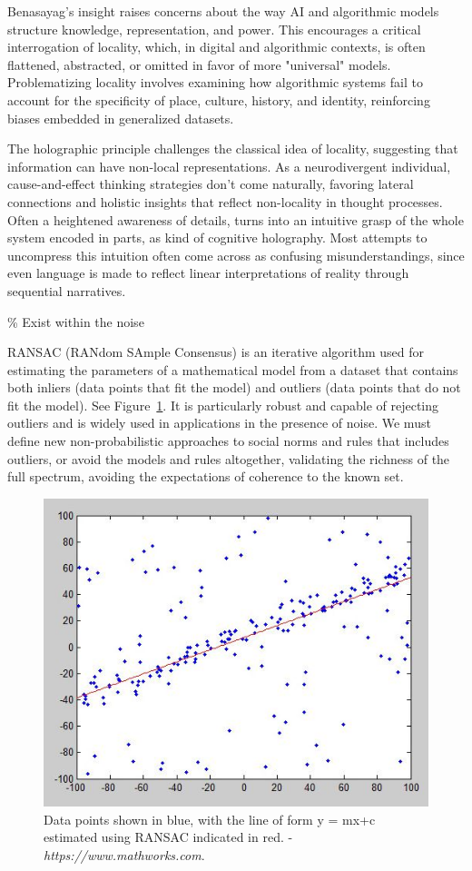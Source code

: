 Benasayag's insight raises concerns about the way AI and algorithmic models structure knowledge, representation, and power. This encourages a critical interrogation of locality, which, in digital and algorithmic contexts, is often flattened, abstracted, or omitted in favor of more "universal" models. Problematizing locality involves examining how algorithmic systems fail to account for the specificity of place, culture, history, and identity, reinforcing biases embedded in generalized datasets.

The holographic principle challenges the classical idea of locality, suggesting that information can have non-local representations. As a neurodivergent individual, cause-and-effect thinking strategies don't come naturally, favoring lateral connections and holistic insights that reflect non-locality in thought processes. Often a heightened awareness of details, turns into an intuitive grasp of the whole system encoded in parts, as kind of cognitive holography. Most attempts to uncompress this intuition often come across as confusing misunderstandings, since even language is made to reflect linear interpretations of reality through sequential narratives.

{\scriptsize \textcolor{comment}{\% Exist within the noise }}

RANSAC (RANdom SAmple Consensus) is an iterative algorithm used for estimating the parameters of a mathematical model from a dataset that contains both inliers (data points that fit the model) and outliers (data points that do not fit the model). See Figure~\ref{fig:ransac}. It is particularly robust and capable of rejecting outliers and is widely used in applications in the presence of noise. We must define new non-probabilistic approaches to social norms and rules that includes outliers, or avoid the models and rules altogether, validating the richness of the full spectrum, avoiding the expectations of coherence to the known set. 

\begin{figure}
    \centering
    \includegraphics[width=0.8\linewidth]{assets/ransac.jpg} 
    \caption{\small Data points shown in blue, with the line of form y = mx+c estimated using RANSAC indicated in red. - \textit{https://www.mathworks.com}.}
    \label{fig:ransac}
\end{figure}

